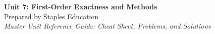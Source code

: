 




\begin{center}
    {\LARGE \bfseries Unit 7: First-Order Exactness and Methods}\\[6pt]
    {\large Prepared by Staples Education}\\[4pt]
    {\itshape Master Unit Reference Guide: Cheat Sheet, Problems, and Solutions}
\end{center}

\vspace{0.4em}

\tableofcontents

\vspace{0.4em}

